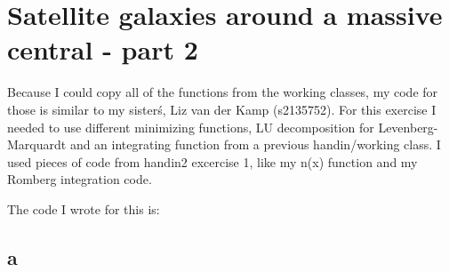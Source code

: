 \section{Satellite galaxies around a massive central - part 2}

Because I could copy all of the functions from the working classes, 
my code for those is similar to my sister\'s, Liz van der Kamp (s2135752). 
For this exercise I needed to use different minimizing functions, LU decomposition for Levenberg-Marquardt
and an integrating function from a previous handin/working class.
I used pieces of code from handin2 excercise 1, like my n(x) function and my Romberg integration code.

The code I wrote for this is:


\subsection*{a}

